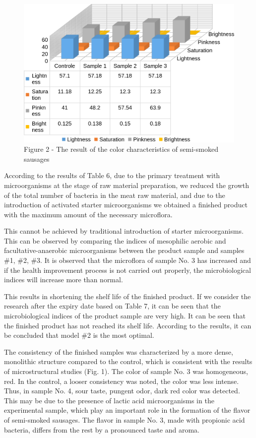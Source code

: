 \begin{figure}[H]
	\centering
	\includegraphics[width=0.6\columnwidth]{media/pish/image2}
	\caption*{Figure 2 - The result of the color characteristics of semi-smoked sausages}
\end{figure}

\begin{multicols}{2}
According to the results of Table 6, due to the primary treatment with
microorganisms at the stage of raw material preparation, we reduced the
growth of the total number of bacteria in the meat raw material, and due
to the introduction of activated starter microorganisms we obtained a
finished product with the maximum amount of the necessary microflora.

This cannot be achieved by traditional introduction of starter
microorganisms. This can be observed by comparing the indices of
mesophilic aerobic and facultative-anaerobic microorganisms between the
product sample and samples \#1, \#2, \#3. It is observed that the
microflora of sample No. 3 has increased and if the health improvement
process is not carried out properly, the microbiological indices will
increase more than normal.

This results in shortening the shelf life of the finished product. If we
consider the research after the expiry date based on Table 7, it can be
seen that the microbiological indices of the product sample are very
high. It can be seen that the finished product has not reached its shelf
life. According to the results, it can be concluded that model \#2 is
the most optimal.

The consistency of the finished samples was characterized by a more
dense, monolithic structure compared to the control, which is consistent
with the results of microstructural studies (Fig. 1). The color of
sample No. 3 was homogeneous, red. In the control, a looser consistency
was noted, the color was less intense. Thus, in sample No. 4, sour
taste, pungent odor, dark red color was detected. This may be due to the
presence of lactic acid microorganisms in the experimental sample, which
play an important role in the formation of the flavor of semi-smoked
sausages. The flavor in sample No. 3, made with propionic acid bacteria,
differs from the rest by a pronounced taste and aroma.


\end{multicols}
